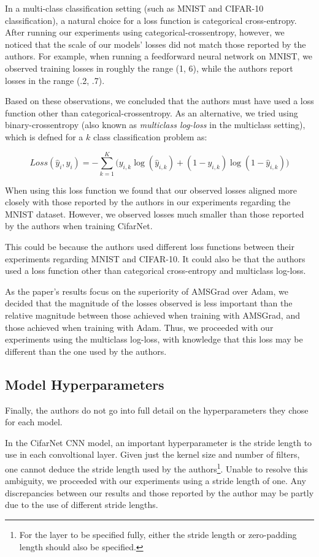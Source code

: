 \documentclass[letterpaper, 10 pt, conference]{ieeeconf}  %
\begin{document}
In a multi-class classification setting (such as MNIST and CIFAR-10 classification), a natural choice for a loss function is categorical cross-entropy. After running our experiments using categorical-crossentropy, however, we noticed that the scale of our models' losses did not match those reported by the authors. For example, when running a feedforward neural network on MNIST, we observed training losses in roughly the range (1, 6), while the authors report losses in the range (.2, .7). 

Based on these observations, we concluded that the authors must have used a loss function other than categorical-crossentropy. As an alternative, we tried using binary-crossentropy (also known as \emph{multiclass log-loss} in the multiclass setting), which is defned for a $k$ class classification problem as:

\[
Loss(\hat{y}_i, y_i) = -\sum_{k = 1}^K \big( y_{i,k}\log(\hat{y}_{i,k}) + (1 - y_{i,k})\log(1 - \hat{y}_{i,k})  \big)
\]

When using this loss function we found that our observed losses aligned more closely with those reported by the authors in our experiments regarding the MNIST dataset. However, we observed losses much smaller than those reported by the authors when training CifarNet. 

This could be because the authors used different loss functions between their experiments regarding MNIST and CIFAR-10. It could also be that the authors used a loss function other than categorical cross-entropy and multiclass log-loss.

As the paper's results focus on the superiority of AMSGrad over Adam, we decided that the magnitude of the losses observed is less important than the relative magnitude between those achieved when training with AMSGrad, and those achieved when training with Adam. Thus, we proceeded with our experiments using the multiclass log-loss, with knowledge that this loss may be different than the one used by the authors.

\subsection{Model Hyperparameters}

Finally, the authors do not go into full detail on the hyperparameters they chose for each model. 

In the CifarNet CNN model, an important hyperparameter is the stride length to use in each convoltional layer. Given just the kernel size and number of filters, one cannot deduce the stride length used by the authors\footnote{For the layer to be specified fully, either the stride length or zero-padding length should also be specified.}. Unable to resolve this ambiguity, we proceeded with our experiments using a stride length of one. Any discrepancies between our results and those reported by the author may be partly due to the use of different stride lengths. 
\end{document}
